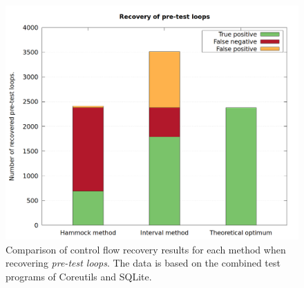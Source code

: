 \begin{figure}[htbp]
	\centering
	\includegraphics[width=\textwidth]{inc/5_results/results_pre_loop.png}
	\caption{Comparison of control flow recovery results for each method when recovering \textit{pre-test loops}. The data is based on the combined test programs of Coreutils and SQLite.}
	\label{fig:total_results_pre_loop}
\end{figure}
